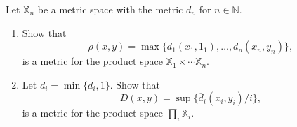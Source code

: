 \documentclass[a4paper,12pt, reqno]{article}
\theoremstyle{definition}
\newenvironment{exerr}[1]{
  \renewcommand\theexeralt{#1}
  \exeralt
}{\endexeralt}
\newcommand{\N}{\mathbb{N}}
\newcommand{\X}{\mathbb{X}}
\begin{document}
\begin{exerr}{3}
  Let $\X_{n}$ be a metric space with the metric $d_{n}$ for $n\in\N$.
  \begin{enumerate}[label=(\alph*)]
    \item Show that
          \begin{equation*}
            \rho(x,y) = \max\{ d_{1}(x_{1},1_{1}),\dots, d_{n}(x_{n},y_{n}) \},
          \end{equation*}
          is a metric for the product space $\X_{1}\times\cdots\X_{n}$.
    \item Let $\overline{d}_{i} = \min\{ d_{i},1 \}$. Show that
          \begin{equation*}
            D(x,y) = \sup\{ \overline{d}_{i}(x_{i},y_{i})/i \},
          \end{equation*}
          is a metric for the product space $\prod_{i}\X_{i}$.
  \end{enumerate}
\end{exerr}
\end{document}
